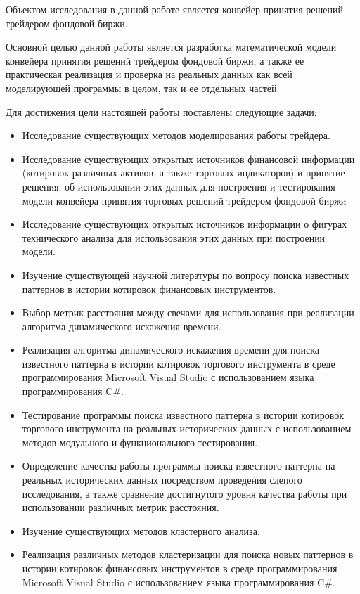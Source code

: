 \documentclass[a4paper, 14pt]{extarticle}
\numberwithin{figure}{subsection}
\numberwithin{equation}{subsection}
\begin{document}
Объектом исследования в данной работе является конвейер принятия решений трейдером фондовой биржи.

Основной целью данной работы является разработка математической модели конвейера принятия решений трейдером фондовой биржи, а также ее практическая реализация и проверка на реальных данных как всей моделирующей программы в целом, так и ее отдельных частей.

Для достижения цели настоящей работы поставлены следующие задачи:

\begin{itemize}
\item Исследование существующих методов моделирования работы трейдера.
\item Исследование существующих открытых источников финансовой информации
(котировок различных активов, а также торговых индикаторов) и принятие решения.
об использовании этих данных для построения и тестирования модели конвейера принятия торговых решений трейдером фондовой биржи
\item Исследование существующих открытых источников информации о фигурах технического анализа для использования этих данных при построении модели.
\item Изучение существующей научной литературы по вопросу поиска известных паттернов в истории котировок финансовых инструментов.
\item Выбор метрик расстояния между свечами для использования при реализации алгоритма динамического искажения времени.
\item Реализация алгоритма динамического искажения времени для поиска известного паттерна в истории котировок торгового инструмента в среде программирования Microsoft Visual Studio с использованием языка программирования C\#.
\item Тестирование программы поиска известного паттерна в истории котировок торгового инструмента на реальных исторических данных с использованием методов модульного и функционального тестирования.
\item Определение качества работы программы поиска известного паттерна на реальных исторических данных посредством проведения слепого исследования, а также сравнение достигнутого уровня качества работы при использовании различных метрик расстояния.
\item Изучение существующих методов кластерного анализа.
\item Реализация различных методов кластеризации для поиска новых паттернов в истории котировок финансовых инструментов в среде программирования Microsoft Visual Studio с использованием языка программирования C\#.

\end{itemize}
\end{document}
